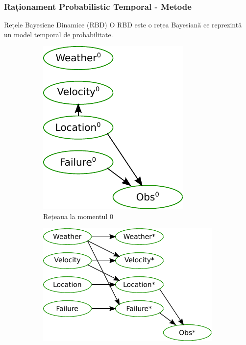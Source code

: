 \begin{frame}[t]
    \frametitle{Raționament Probabilistic Temporal - Metode}
  	\begin{block}{Rețele Bayesiene Dinamice (RBD)}
  		O RBD este o rețea Bayesiană ce reprezintă un model temporal de probabilitate.
  	\end{block}
  	
  	\begin{figure}
  		\centering
		\begin{subfigure}[b]{0.15\textwidth}
			\centering
  			\includegraphics[width=\textwidth]{graphics/hmm-intro/dbn-vehicle/zero.pdf}
  			\caption{\tiny{Rețeaua la momentul 0}}
  			\label{fig:2TBN}
  		\end{subfigure}
  		\begin{subfigure}[b]{0.30\textwidth}
			\centering
			\includegraphics[width=\textwidth]{graphics/hmm-intro/dbn-vehicle/transition.pdf}

\end{subfigure}
\end{figure}
\end{frame}
